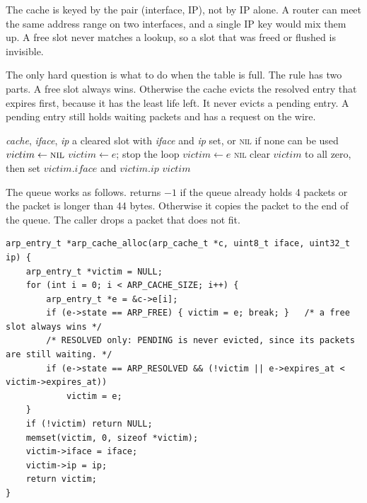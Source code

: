 The cache is keyed by the pair (interface, IP), not by IP alone. A router can meet the same address range on two interfaces, and a single IP key would mix them up. A free slot never matches a lookup, so a slot that was freed or flushed is invisible.

The only hard question is what to do when the table is full. The rule has two parts. A free slot always wins. Otherwise the cache evicts the resolved entry that expires first, because it has the least life left. It never evicts a pending entry. A pending entry still holds waiting packets and has a request on the wire.

\begin{algorithm}[H]\small
\caption{Pick a slot for a new entry ()}
\label{alg:alloc}
\begin{algorithmic}[1]
\Require \textit{cache}, \textit{iface}, \textit{ip}
\Ensure a cleared slot with \textit{iface} and \textit{ip} set, or \textsc{nil} if none can be used
\State $victim \gets \textsc{nil}$
    \State $victim \gets e$; stop the loop 
  \EndIf
    \State $victim \gets e$ 
  \EndIf
\EndFor
{} \Return \textsc{nil}
\EndIf
\State clear $victim$ to all zero, then set $victim.iface$ and $victim.ip$ 
\State \Return $victim$
\end{algorithmic}
\end{algorithm}

The queue works as follows.  returns $-1$ if the queue already holds 4 packets or the packet is longer than 44 bytes. Otherwise it copies the packet to the end of the queue. The caller drops a packet that does not fit.

\begin{lstlisting}[style=corelst, firstnumber=15, caption={\code{src/arp\_cache.c}, lines 15--29: the slot picker.}]
arp_entry_t *arp_cache_alloc(arp_cache_t *c, uint8_t iface, uint32_t ip) {
    arp_entry_t *victim = NULL;
    for (int i = 0; i < ARP_CACHE_SIZE; i++) {
        arp_entry_t *e = &c->e[i];
        if (e->state == ARP_FREE) { victim = e; break; }   /* a free slot always wins */
        /* RESOLVED only: PENDING is never evicted, since its packets are still waiting. */
        if (e->state == ARP_RESOLVED && (!victim || e->expires_at < victim->expires_at))
            victim = e;
    }
    if (!victim) return NULL;
    memset(victim, 0, sizeof *victim);
    victim->iface = iface;
    victim->ip = ip;
    return victim;
}
\end{lstlisting}

